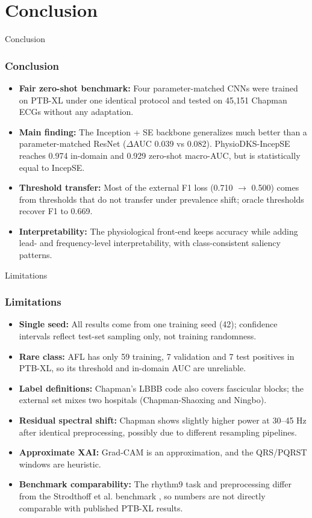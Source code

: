 \documentclass[serif, aspectratio=169]{beamer}
\begin{document}
\section{Conclusion}

\begin{frame}{Conclusion}
	\frametitle<presentation>{Conclusion}
	\begin{itemize}
		\item \textbf{Fair zero-shot benchmark:} Four parameter-matched CNNs were trained on PTB-XL under one identical protocol and tested on 45,151 Chapman ECGs without any adaptation.
		\item \textbf{Main finding:} The Inception + SE backbone generalizes much better than a parameter-matched ResNet ($\Delta$AUC 0.039 vs 0.082). PhysioDKS-IncepSE reaches 0.974 in-domain and 0.929 zero-shot macro-AUC, but is statistically equal to IncepSE.
		\item \textbf{Threshold transfer:} Most of the external F1 loss (0.710 $\rightarrow$ 0.500) comes from thresholds that do not transfer under prevalence shift; oracle thresholds recover F1 to 0.669.
		\item \textbf{Interpretability:} The physiological front-end keeps accuracy while adding lead- and frequency-level interpretability, with class-consistent saliency patterns.
	\end{itemize}
\end{frame}

\begin{frame}{Limitations}
	\frametitle<presentation>{Limitations}
	\begin{itemize}
		\item \textbf{Single seed:} All results come from one training seed (42); confidence intervals reflect test-set sampling only, not training randomness.
		\item \textbf{Rare class:} AFL has only 59 training, 7 validation and 7 test positives in PTB-XL, so its threshold and in-domain AUC are unreliable.
		\item \textbf{Label definitions:} Chapman's LBBB code also covers fascicular blocks; the external set mixes two hospitals (Chapman-Shaoxing and Ningbo).
		\item \textbf{Residual spectral shift:} Chapman shows slightly higher power at 30--45 Hz after identical preprocessing, possibly due to different resampling pipelines.
		\item \textbf{Approximate XAI:} Grad-CAM is an approximation, and the QRS/PQRST windows are heuristic.
		\item \textbf{Benchmark comparability:} The rhythm9 task and preprocessing differ from the Strodthoff et al. benchmark \cite{strodthoff2021}, so numbers are not directly comparable with published PTB-XL results.
	\end{itemize}
\end{frame}
\end{document}
